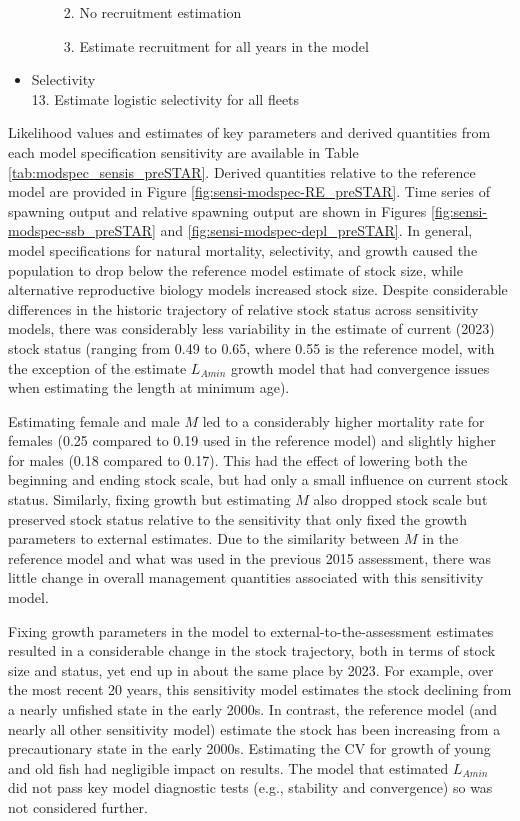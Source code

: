 \documentclass[11pt,
  letterpaper,
]{article}
\providecommand{\tightlist}{%
  \setlength{\itemsep}{0pt}\setlength{\parskip}{0pt}}
\providecommand{\tightlist}{%
  \setlength{\itemsep}{0pt}\setlength{\parskip}{0pt}}
\begin{document}
\begin{itemize}
\begin{itemize}
    \begin{enumerate}
    \def\labelenumi{\arabic{enumi}.}
    \setcounter{enumi}{10}
    \tightlist
    \item
      No recruitment estimation
    \item
      Estimate recruitment for all years in the model
    \end{enumerate}
  \end{itemize}
\item
  Selectivity\\
  13. Estimate logistic selectivity for all fleets
\end{itemize}

Likelihood values and estimates of key parameters and derived quantities from each model specification sensitivity are available in Table \ref{tab:modspec_sensis_preSTAR}. Derived quantities relative to the reference model are provided in Figure \ref{fig:sensi-modspec-RE_preSTAR}. Time series of spawning output and relative spawning output are shown in Figures \ref{fig:sensi-modspec-ssb_preSTAR} and \ref{fig:sensi-modspec-depl_preSTAR}. In general, model specifications for natural mortality, selectivity, and growth caused the population to drop below the reference model estimate of stock size, while alternative reproductive biology models increased stock size. Despite considerable differences in the historic trajectory of relative stock status across sensitivity models, there was considerably less variability in the estimate of current (2023) stock status (ranging from 0.49 to 0.65, where 0.55 is the reference model, with the exception of the estimate \(L_{Amin}\) growth model that had convergence issues when estimating the length at minimum age).

Estimating female and male \(M\) led to a considerably higher mortality rate for females (0.25 compared to 0.19 used in the reference model) and slightly higher for males (0.18 compared to 0.17). This had the effect of lowering both the beginning and ending stock scale, but had only a small influence on current stock status. Similarly, fixing growth but estimating \(M\) also dropped stock scale but preserved stock status relative to the sensitivity that only fixed the growth parameters to external estimates. Due to the similarity between \(M\) in the reference model and what was used in the previous 2015 assessment, there was little change in overall management quantities associated with this sensitivity model.

Fixing growth parameters in the model to external-to-the-assessment estimates resulted in a considerable change in the stock trajectory, both in terms of stock size and status, yet end up in about the same place by 2023. For example, over the most recent 20 years, this sensitivity model estimates the stock declining from a nearly unfished state in the early 2000s. In contrast, the reference model (and nearly all other sensitivity model) estimate the stock has been increasing from a precautionary state in the early 2000s. Estimating the CV for growth of young and old fish had negligible impact on results. The model that estimated \(L_{Amin}\) did not pass key model diagnostic tests (e.g., stability and convergence) so was not considered further.
\end{document}
